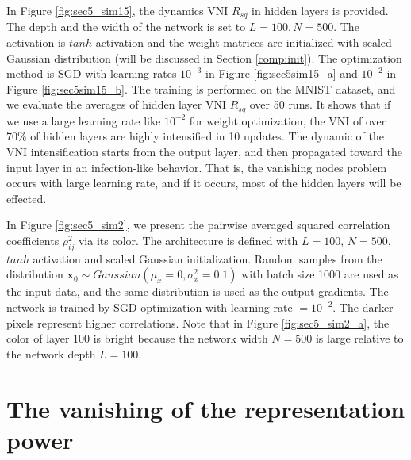 In Figure \ref{fig:sec5_sim15}, the dynamics VNI $R_{sq}$ in hidden layers is provided.
The depth and the width of the network is set to $L=100, N=500$.
The activation is $tanh$ activation and the weight matrices are initialized with scaled Gaussian
distribution (will be discussed in Section \ref{comp:init}).
The optimization method is SGD with learning rates $10^{-3}$ in Figure \ref{fig:sec5sim15_a} and
$10^{-2}$ in Figure \ref{fig:sec5sim15_b}.
The training is performed on the MNIST dataset, and we evaluate the averages of hidden layer
VNI $R_{sq}$ over 50 runs.
It shows that if we use a large learning rate like $10^{-2}$ for weight optimization, the VNI of
over 70\% of hidden layers are highly intensified in 10 updates.
The dynamic of the VNI intensification starts from the output layer, and then propagated toward the
input layer in an infection-like behavior. 
That is, the vanishing nodes problem occurs with large learning rate, and if it occurs, most of the
hidden layers will be effected.

In Figure \ref{fig:sec5_sim2}, we present the pairwise averaged squared correlation coefficients
$\rho_{ij}^2$ via its color.
The architecture is defined with $L=100$, $N=500$, $tanh$ activation and scaled Gaussian initialization.
Random samples from the distribution $\mathbf{x}_0\sim Gaussian(\mu_x=0, \sigma^2_x=0.1)$
with batch size 1000 are used as the input data, and the same distribution is used as the output gradients. 
The network is trained by SGD optimization with learning rate $=10^{-2}$.
The darker pixels represent higher correlations.
Note that in Figure \ref{fig:sec5_sim2_a}, the color of layer 100 is bright because the network width
$N=500$ is large relative to the network depth $L=100$.









\section{The vanishing of the representation power} \label{repr_general}

